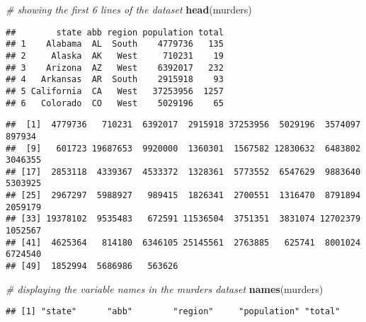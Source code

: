 \documentclass[]{article}
\newenvironment{Shaded}{\begin{snugshade}}{\end{snugshade}}
\newcommand{\CommentTok}[1]{\textcolor[rgb]{0.56,0.35,0.01}{\textit{#1}}}
\newcommand{\KeywordTok}[1]{\textcolor[rgb]{0.13,0.29,0.53}{\textbf{#1}}}
\newcommand{\NormalTok}[1]{#1}
\newcommand{\OperatorTok}[1]{\textcolor[rgb]{0.81,0.36,0.00}{\textbf{#1}}}
\newcommand{\StringTok}[1]{\textcolor[rgb]{0.31,0.60,0.02}{#1}}
\begin{document}
\begin{Shaded}
\begin{Highlighting}[]
\CommentTok{# showing the first 6 lines of the dataset}
\KeywordTok{head}\NormalTok{(murders)}
\end{Highlighting}
\end{Shaded}

\begin{verbatim}
##        state abb region population total
## 1    Alabama  AL  South    4779736   135
## 2     Alaska  AK   West     710231    19
## 3    Arizona  AZ   West    6392017   232
## 4   Arkansas  AR  South    2915918    93
## 5 California  CA   West   37253956  1257
## 6   Colorado  CO   West    5029196    65
\end{verbatim}

\begin{Shaded}
\end{Shaded}

\begin{verbatim}
##  [1]  4779736   710231  6392017  2915918 37253956  5029196  3574097   897934
##  [9]   601723 19687653  9920000  1360301  1567582 12830632  6483802  3046355
## [17]  2853118  4339367  4533372  1328361  5773552  6547629  9883640  5303925
## [25]  2967297  5988927   989415  1826341  2700551  1316470  8791894  2059179
## [33] 19378102  9535483   672591 11536504  3751351  3831074 12702379  1052567
## [41]  4625364   814180  6346105 25145561  2763885   625741  8001024  6724540
## [49]  1852994  5686986   563626
\end{verbatim}

\begin{Shaded}
\begin{Highlighting}[]
\CommentTok{# displaying the variable names in the murders dataset}
\KeywordTok{names}\NormalTok{(murders)}
\end{Highlighting}
\end{Shaded}

\begin{verbatim}
## [1] "state"      "abb"        "region"     "population" "total"
\end{verbatim}

\begin{Shaded}
\end{Shaded}
\end{document}
